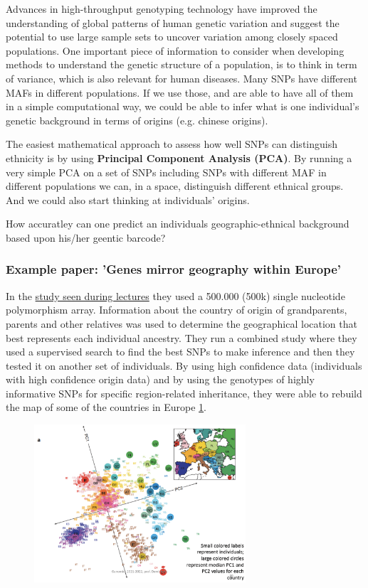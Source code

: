 Advances in high-throughput genotyping technology have improved the understanding of global patterns of human genetic variation and suggest the potential to use large sample sets to uncover variation among closely spaced populations.
One important piece of information to consider when developing methods to understand the genetic structure of a population, is to think in term of variance, which is also relevant for human diseases. 
Many SNPs have different MAFs in different populations. If we use those, and are able to have all of them in a simple computational way, we could be able to infer what is one individual's genetic background in terms of origins (e.g. chinese origins). 

The easiest mathematical approach to assess how well SNPs can distinguish ethnicity is by using \textbf{Principal Component Analysis (PCA)}. By running a very simple PCA on a set of SNPs including SNPs with different MAF in different populations we can, in a space, distinguish different ethnical groups. And we could also start thinking at individuals' origins. 

How accuratley can one predict an individuals geographic-ethnical background based upon his/her geentic barcode?

\subsubsection*{Example paper: 'Genes mirror geography within Europe'}

In the \href{https://www.ncbi.nlm.nih.gov/pmc/articles/PMC2735096/}{study seen during lectures} they used a 500.000 (500k) single nucleotide polymorphism array. Information about the country of origin of grandparents, parents and other relatives was used to determine the geographical location that best represents each individual ancestry. 
They run a combined study where they used a supervised search to find the best SNPs to make inference and then they tested it on another set of individuals. 
By using high confidence data (individuals with high confidence origin data) and by using the genotypes of highly informative SNPs for specific region-related inheritance, they were able to rebuild the map of some of the countries in Europe \ref*{fig:PCA_countries}. 

\begin{figure}
	\centering
	\includegraphics[width=0.7\textwidth]{PCA.PNG}
	\caption{\label{fig:PCA_countries}}
\end{figure}

